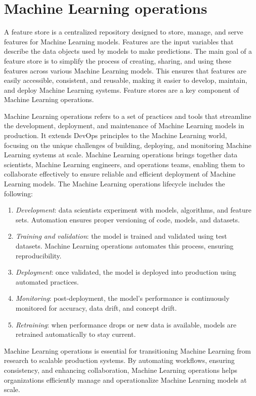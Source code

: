 \section{Machine Learning operations}

A feature store is a centralized repository designed to store, manage, and serve features for Machine Learning models.
Features are the input variables that describe the data objects used by models to make predictions. 
The main goal of a feature store is to simplify the process of creating, sharing, and using these features across various Machine Learning models. 
This ensures that features are easily accessible, consistent, and reusable, making it easier to develop, maintain, and deploy Machine Learning systems. 
Feature stores are a key component of Machine Learning operations.

Machine Learning operations refers to a set of practices and tools that streamline the development, deployment, and maintenance of Machine Learning models in production. 
It extends DevOps principles to the Machine Learning world, focusing on the unique challenges of building, deploying, and monitoring Machine Learning systems at scale. 
Machine Learning operations brings together data scientists, Machine Learning engineers, and operations teams, enabling them to collaborate effectively to ensure reliable and efficient deployment of Machine Learning models.
The Machine Learning operations lifecycle includes the following: 
\begin{enumerate}
    \item \textit{Development}: data scientists experiment with models, algorithms, and feature sets. 
        Automation ensures proper versioning of code, models, and datasets.
    \item \textit{Training and validation}: the model is trained and validated using test datasets. 
        Machine Learning operations automates this process, ensuring reproducibility.
    \item \textit{Deployment}: once validated, the model is deployed into production using automated practices.
    \item \textit{Monitoring}: post-deployment, the model's performance is continuously monitored for accuracy, data drift, and concept drift.
    \item \textit{Retraining}: when performance drops or new data is available, models are retrained automatically to stay current.
\end{enumerate}
\noindent Machine Learning operations is essential for transitioning Machine Learning from research to scalable production systems. 
By automating workflows, ensuring consistency, and enhancing collaboration, Machine Learning operations helps organizations efficiently manage and operationalize Machine Learning models at scale.

